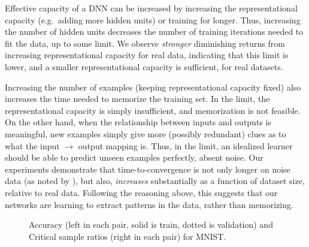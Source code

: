 \documentclass{article}
\begin{document}
Effective capacity of a DNN can be increased by increasing the representational capacity (e.g.~adding more hidden units) or training for longer.
Thus, increasing the number of hidden units decreases the number of training iterations needed to fit the data, up to some limit.
We observe \emph{stronger} diminishing returns from increasing representational capacity for real data, indicating that this limit is lower, and a smaller representational capacity is sufficient, for real datasets.

Increasing the number of examples (keeping representational capacity fixed) also increases the time needed to memorize the training set.
In the limit, the representational capacity is simply insufficient, and memorization is not feasible.
On the other hand, when the relationship between inputs and outputs is meaningful, new examples simply give more (possibly redundant) clues as to what the input $\rightarrow$ output mapping is.
Thus, in the limit, an idealized learner should be able to predict unseen examples perfectly, absent noise.
Our experiments demonstrate that time-to-convergence is not only longer on noise data (as noted by \citet{understanding_DL}), but also, \emph{increases} substantially as a function of dataset size, relative to real data.
Following the reasoning above, this suggests that our networks are learning to extract patterns in the data, rather than memorizing. 


        \begin{figure*}[!t]
		\center
		\hspace{0.3mm}
		\caption{Accuracy (left in each pair, solid is train, dotted is validation) and Critical sample ratios (right in each pair) for MNIST.}

	\label{fig:mnist_nicolas}
	\end{figure*}
\end{document}
